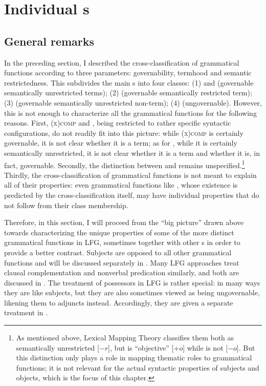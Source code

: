 \documentclass[output=paper]{../langscibook}
\begin{document}
 \section{Individual {\GF}s\label{sect:gfs:main-gfs}}
 
 \subsection{General remarks\label{sect:gfs:gf-gen-remarks}}
 
 In the preceding section, I described the cross-classification of grammatical functions according to three parameters: governability, termhood and semantic restrictedness. This subdivides the main {\GF}s into four classes: (1) \SUBJ and \OBJ (governable semantically unrestricted terms); (2) {\OBJTHETA} (governable semantically restricted term); (3) {\OBLTHETA} (governable semantically unrestricted non-term); (4) \ADJ (ungovernable). However, this is not enough to characterize all the grammatical functions for the following reasons. First, \textsc{(x)comp} and \POSS, being restricted to rather specific syntactic configurations, do not readily fit into this picture: while \textsc{(x)comp} is certainly governable, it is not clear whether it is a term; as for \POSS, while it is certainly semantically unrestricted, it is not clear whether it is a term and whether it is, in fact, governable. Secondly, the distinction between \SUBJ and \OBJ remains unspecified.\footnote{As mentioned above, Lexical Mapping Theory classifies them both as semantically unrestricted [$-r$], but \OBJ is ``objective'' [$+{o}$] while \SUBJ is not [$-{o}$]. But this distinction only plays a role in mapping thematic roles to grammatical functions; it is not relevant for the actual syntactic properties of subjects and objects, which is the focus of this chapter.} Thirdly, the cross-classification of grammatical functions is not meant to explain all of their properties: even grammatical functions like {\OBJTHETA}, whose existence is predicted by the cross-classification itself, may have individual properties that do not follow from their class membership.
 
 Therefore, in this section, I will proceed from the ``big picture'' drawn above towards characterizing the unique properties of some of the more distinct grammatical functions in LFG, sometimes together with other {\GF}s in order to provide a better contrast. Subjects are opposed to all other grammatical functions and will be discussed separately in . Many LFG approaches treat clausal complementation and nonverbal predication similarly, and both are discussed in . The treatment of possessors in LFG is rather special: in many ways they are like subjects, but they are also sometimes viewed as being ungovernable, likening them to adjuncts instead. Accordingly, they are given a separate treatment in .
 
\end{document}
